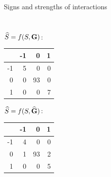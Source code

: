 \documentclass[11pt]{beamer}
\newcommand\Gb{{\bf G}}
\begin{document}
\begin{frame}{Signs and strengths of interactions}
{\begin{columns}
\begin{column}{0.3\linewidth}
\begin{table}[ht]
\begin{tabular}{r|rrr}
\end{tabular}
\end{table}
$\widehat{S} =f(S,\Gb)$:
\begin{table}[ht]
\centering
\begin{tabular}{r|rrr}

 & -1 & 0 & 1 \\ 
  \hline
-1 &   5 &   0 &   0 \\ 
  0 &   0 &  93 &   0 \\ 
  1 &   0 &   0 &   7 \\ 

\end{tabular}
\end{table}
$\widehat{S} =f(S,\widehat{\Gb})$:
\begin{table}[ht]
\centering
\begin{tabular}{r|rrr}

 & -1 & 0 & 1 \\ 
  \hline
-1 &   4 &   0 &   0 \\ 
  0 &   1 &  93 &   2 \\ 
  1 &   0 &   0 &   5 \\ 

\end{tabular}
\end{table}
     \end{column}
  \end{columns}}
          
 \end{frame}
\end{document}
